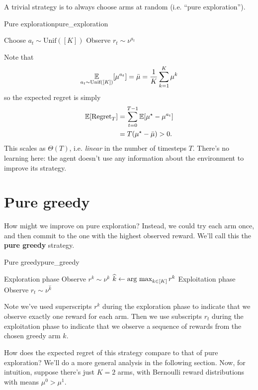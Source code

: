 \documentclass[\main/main]{subfiles}
\begin{document}
A trivial strategy is to always choose arms at random (i.e. ``pure exploration'').
\begin{definition}{Pure exploration}{pure_exploration}
\begin{algorithmic}
    \State Choose $a_t \sim \text{Unif}([K])$
    \State Observe $r_t \sim \nu^{a_t}$
\EndFor
\end{algorithmic}
\end{definition}
Note that \[
    \operatorname*{\mathbb{E}}_{a_t \sim \text{Unif}([K])}[\mu^{a_t}] = \bar \mu = \frac{1}{K} \sum_{k=1}^K \mu^k
\] so the expected regret is simply
\begin{align*}
    \operatorname*{\mathbb{E}}[\text{Regret}_T] &= \sum_{t=0}^{T-1} \operatorname*{\mathbb{E}}[\mu^\star - \mu^{a_t}] \\
    &= T (\mu^\star - \bar \mu) > 0.
\end{align*}
This scales as $\Theta(T)$, i.e. \emph{linear} in the number of timesteps $T$. There's no learning here: the agent doesn't use any information about the environment to improve its strategy.

\section{Pure greedy}

How might we improve on pure exploration? Instead, we could try each arm once, and then commit to the one with the highest observed reward. We'll call this the \textbf{pure greedy} strategy.

\begin{definition}{Pure greedy}{pure_greedy}
\begin{algorithmic}
        \Comment Exploration phase
        \State Observe $r^k \sim \nu^k$
    \EndFor
    \State $\widehat k \gets \operatorname*{\textrm{arg\ max}}_{k \in [K]} r^k$
        \Comment Exploitation phase
        \State Observe $r_t \sim \nu^{\hat k}$
    \EndFor
\end{algorithmic}
Note we've used superscripts $r^k$ during the exploration phase to indicate that we observe exactly one reward for each arm. Then we use subscripts $r_t$ during the exploitation phase to indicate that we observe a sequence of rewards from the chosen greedy arm $\hat k$.
\end{definition}

How does the expected regret of this strategy compare to that of pure exploration? We'll do a more general analysis in the following section. Now, for intuition, suppose there's just $K=2$ arms, with Bernoulli reward distributions with means $\mu^0 > \mu^1$.
\end{document}
